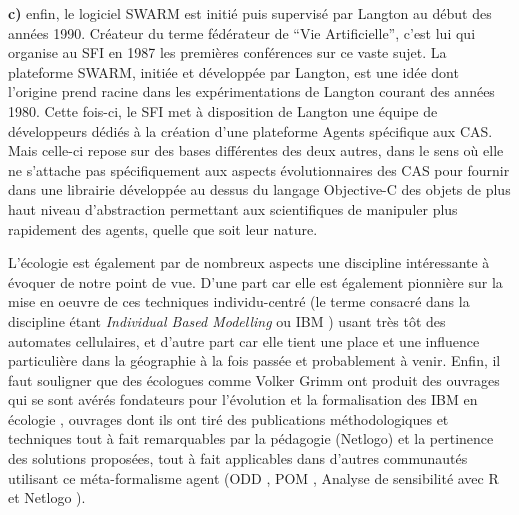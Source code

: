 \textbf{c)} enfin, le logiciel SWARM \autocite{Minar1996} est initié puis supervisé par Langton au début des années 1990. Créateur du terme fédérateur de \enquote{Vie Artificielle}, c'est lui qui organise au SFI en 1987 les premières conférences sur ce vaste sujet. La plateforme SWARM, initiée et développée par Langton, est une idée dont l'origine prend racine dans les expérimentations de Langton courant des années 1980. Cette fois-ci, le SFI met à disposition de Langton une équipe de développeurs dédiés à la création d'une plateforme Agents spécifique aux CAS. Mais celle-ci repose sur des bases différentes des deux autres, dans le sens où elle ne s'attache pas spécifiquement aux aspects évolutionnaires des CAS pour fournir dans une librairie développée au dessus du langage Objective-C des objets de plus haut niveau d'abstraction permettant aux scientifiques de manipuler plus rapidement des agents, quelle que soit leur nature.





L'écologie est également par de nombreux aspects une discipline intéressante à évoquer de notre point de vue. D'une part car elle est également pionnière sur la mise en oeuvre de ces techniques individu-centré (le terme consacré dans la discipline étant \textit{Individual Based Modelling} ou IBM ) usant très tôt des automates cellulaires, et d'autre part car elle tient une place et une influence particulière dans la géographie à la fois passée et probablement à venir. Enfin, il faut souligner que des écologues comme Volker Grimm ont produit des ouvrages qui se sont avérés fondateurs pour l'évolution et la formalisation des IBM en écologie \autocites{Grimm2004, DeAngelis2014}, ouvrages dont ils ont tiré des publications méthodologiques et techniques \autocite{Railsback2012} tout à fait remarquables par la pédagogie (Netlogo) et la pertinence des solutions proposées, tout à fait applicables dans d'autres communautés utilisant ce méta-formalisme agent (ODD \autocite{Grimm2010}, POM \autocite{Grimm2005,Grimm2011}, Analyse de sensibilité avec R et Netlogo \autocite{Thiele2011,Thiele2014a}). %

